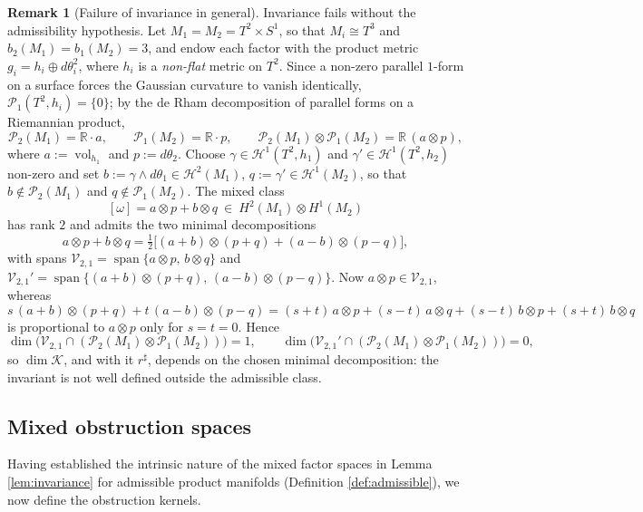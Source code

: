 \documentclass[11pt,reqno]{amsart}
\theoremstyle{plain}
\theoremstyle{definition}
\newtheorem{remark}[theorem]{Remark}
\numberwithin{equation}{section}
\begin{document}
\begin{remark}[Failure of invariance in general]\label{rem:counterexample}
Invariance fails without the admissibility hypothesis.  Let
$M_1=M_2=T^{2}\times S^{1}$, so that $M_i\cong T^{3}$ and
$b_2(M_1)=b_1(M_2)=3$, and endow each factor with the product metric $g_i=h_i\oplus d\theta_i^{2}$, where $h_i$ is a \emph{non-flat} metric on $T^{2}$.  Since a non-zero parallel $1$-form on a surface forces the Gaussian curvature to vanish identically, $\mathcal{P}_1(T^{2},h_i)=\{0\}$; by the
de Rham decomposition of parallel forms on a Riemannian product,
\[
\mathcal{P}_2(M_1)=\mathbb{R}\cdot a,\qquad
\mathcal{P}_1(M_2)=\mathbb{R}\cdot p,\qquad
\mathcal{P}_2(M_1)\otimes\mathcal{P}_1(M_2)=\mathbb{R}\,(a\otimes p),
\]
where $a:=\operatorname{vol}_{h_1}$ and $p:=d\theta_2$.  Choose
$\gamma\in\mathcal{H}^{1}(T^{2},h_1)$ and $\gamma'\in\mathcal{H}^{1}(T^{2},h_2)$
non-zero and set $b:=\gamma\wedge d\theta_1\in\mathcal{H}^{2}(M_1)$, $q:=\gamma'\in\mathcal{H}^{1}(M_2)$, so that $b\notin\mathcal{P}_2(M_1)$ and $q\notin\mathcal{P}_1(M_2)$.  The mixed class
\[
[\omega]=a\otimes p+b\otimes q\ \in\ H^{2}(M_1)\otimes H^{1}(M_2)
\]
has rank $2$ and admits the two minimal decompositions
\[
a\otimes p+b\otimes q
=\tfrac12\big[(a+b)\otimes(p+q)+(a-b)\otimes(p-q)\big],
\]
with spans $\mathcal{V}_{2,1}=\operatorname{span}\{a\otimes p,\,b\otimes q\}$ and $\mathcal{V}_{2,1}'=\operatorname{span}\{(a+b)\otimes(p+q),\,(a-b)\otimes(p-q)\}$.
Now $a\otimes p\in\mathcal{V}_{2,1}$, whereas
\[
s\,(a+b)\otimes(p+q)+t\,(a-b)\otimes(p-q)
=(s+t)\,a\otimes p+(s-t)\,a\otimes q+(s-t)\,b\otimes p+(s+t)\,b\otimes q
\]
is proportional to $a\otimes p$ only for $s=t=0$.  Hence
\[
\dim\big(\mathcal{V}_{2,1}\cap(\mathcal{P}_2(M_1)\otimes\mathcal{P}_1(M_2))\big)=1,
\qquad
\dim\big(\mathcal{V}_{2,1}'\cap(\mathcal{P}_2(M_1)\otimes\mathcal{P}_1(M_2))\big)=0,
\]
so $\dim\mathcal{K}$, and with it $r^{\sharp}$, depends on the chosen minimal decomposition: the invariant is not well defined outside the admissible class.
\end{remark}

\subsection{Mixed obstruction spaces}

Having established the intrinsic nature of the mixed factor spaces in Lemma \ref{lem:invariance} 
for admissible product manifolds (Definition \ref{def:admissible}), we now define the obstruction kernels.
\end{document}
